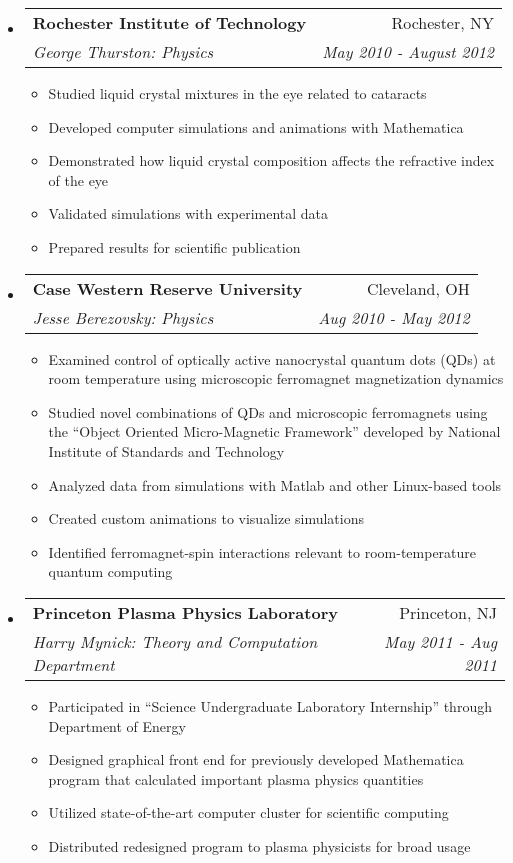 \documentclass[letterpaper,11pt]{article}
\makeatletter
\newcommand{\resitem}[1]{\item #1 \vspace{-2pt}}
\newcommand{\ressubheading}[4]{\vspace{-14pt}
\begin{tabular*}{7.0in}{l@{\extracolsep{\fill}}r}
                \\
                \textbf{#1} & #2 \\
                \textit{#3} & \textit{#4} \\
\end{tabular*}\vspace{-6pt}}
\makeatother
\begin{document}
\begin{itemize}
        
\item
        \ressubheading{Rochester Institute of Technology}{Rochester, NY}{George Thurston: Physics}{May 2010 - August 2012}
        \begin{itemize}
                \resitem{Studied liquid crystal mixtures in the eye related to cataracts}
                \resitem{Developed computer simulations and animations with Mathematica}
                \resitem{Demonstrated how liquid crystal composition affects the refractive index of the eye}
                \resitem{Validated simulations with experimental data}
                \resitem{Prepared results for scientific publication}
        \end{itemize}   
        
\item
        \ressubheading{Case Western Reserve University}{Cleveland, OH}{Jesse Berezovsky: Physics}{Aug 2010 - May 2012}
        \begin{itemize}
                \resitem{Examined control of optically active nanocrystal quantum dots (QDs) at room temperature using microscopic ferromagnet magnetization dynamics}
                \resitem{Studied novel combinations of QDs and microscopic ferromagnets using the ``Object Oriented Micro-Magnetic Framework'' developed by National Institute of Standards and Technology}
                \resitem{Analyzed data from simulations with Matlab and other Linux-based tools}
                \resitem{Created custom animations to visualize simulations}
                \resitem{Identified ferromagnet-spin interactions relevant to room-temperature quantum computing}
                
        \end{itemize}
\item
        \ressubheading{Princeton Plasma Physics Laboratory}{Princeton, NJ}{Harry Mynick: Theory and Computation Department}{May 2011 - Aug 2011}
        \begin{itemize} 
                \resitem{Participated in ``Science Undergraduate Laboratory Internship'' through Department of Energy}
                \resitem{Designed graphical front end for previously developed Mathematica program that calculated important plasma physics quantities}
                \resitem{Utilized state-of-the-art computer cluster for scientific computing}
                \resitem{Distributed redesigned program to plasma physicists for broad usage}                
        \end{itemize}   


\end{itemize}
\end{document}
